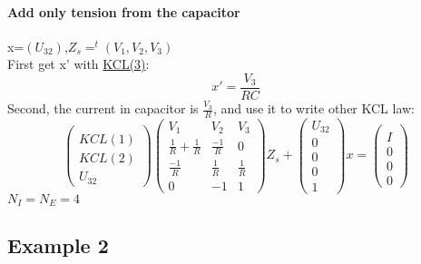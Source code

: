 \documentclass[10pt]{article}
\begin{document}
\paragraph{Add only tension from the capacitor}
x=$(U_{32})$,$Z_{s}=^{t}(V_{1},V_{2},V_{3})$\\
First get x' with \underline{KCL(3)}:
\[x'=\frac{V_{3}}{RC}\]
Second, the current in capacitor is $\frac{V_{3}}{R}$, and use it to write other KCL law:
\[\left(\begin{array}{c}
  \\
  KCL(1)\\
  KCL(2)\\
  U_{32}
  \end{array}\right)
\left(\begin{array}{ccc}
V_{1}&V_{2}&V_{3}\\
  \hline
  \frac{1}{R}+\frac{1}{R}&  \frac{-1}{R}&0\\
  \frac{-1}{R}&  \frac{1}{R}&\frac{1}{R}\\
  0&-1&1
\end{array}\right)Z_{s}+
\left(\begin{array}{c}
U_{32}\\
  \hline
  0\\
  0\\
  0\\
  1
  \end{array}\right)x
=
\left(\begin{array}{c}
  \\
  I\\
  0\\
  0\\
  0
  \end{array}\right)
\]
$N_{I}=N_{E}=4$
\newpage
\subsection{Example 2}
\begin{figure}[h]
\centerline{
 \scalebox{0.9}{
    
 }
}
\end{figure}
\end{document}
